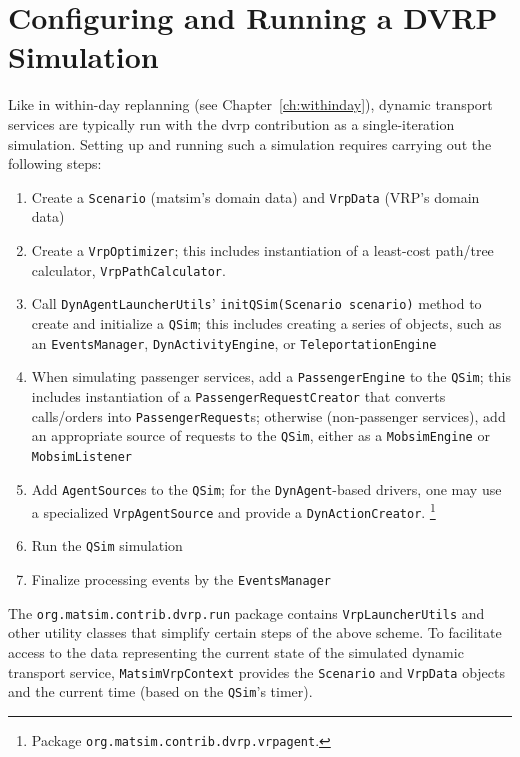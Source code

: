 \section{Configuring and Running a DVRP Simulation}
\label{sec:dvrp_config}
Like in within-day replanning (see Chapter~\ref{ch:withinday}), dynamic transport services are typically run with the \gls{dvrp} contribution as a single-iteration simulation. Setting up and running such a simulation requires carrying out the following steps:
%
\begin{enumerate}\styleEnumerate
	\item Create a \lstinline$Scenario$ (\gls{matsim}'s domain data) and \lstinline$VrpData$ (VRP's domain data)	
	\item Create a \lstinline$VrpOptimizer$; this includes instantiation of a least-cost path/tree calculator, \eg \lstinline$VrpPathCalculator$.
	\item Call \lstinline$DynAgentLauncherUtils$' \lstinline$initQSim(Scenario scenario)$ method to create and initialize a \lstinline$QSim$; this includes creating a series of objects, such as an \lstinline$EventsManager$, \lstinline$DynActivityEngine$, or \lstinline$TeleportationEngine$
	
	\item When simulating passenger services, add a \lstinline$PassengerEngine$ to the \lstinline$QSim$; this includes instantiation of a \lstinline$PassengerRequestCreator$ that converts calls/orders into \lstinline$PassengerRequest$s; otherwise (\ie non-passenger services), add an appropriate source of requests to the \lstinline$QSim$, either as a \lstinline$MobsimEngine$ or \lstinline$MobsimListener$
	
	\item Add \lstinline$AgentSource$s to the \lstinline$QSim$; for the \lstinline$DynAgent$-based drivers, one may use a specialized \lstinline$VrpAgentSource$ and provide a \lstinline$DynActionCreator$.%
	\footnote{
	Package \lstinline$org.matsim.contrib.dvrp.vrpagent$.
	}
	\item Run the \lstinline$QSim$ simulation
	\item Finalize processing events by the \lstinline$EventsManager$
\end{enumerate}

The \lstinline$org.matsim.contrib.dvrp.run$ package contains \lstinline$VrpLauncherUtils$ and other utility classes that simplify certain steps of the above scheme. To facilitate access to the data representing the current state of the simulated dynamic transport service, \lstinline$MatsimVrpContext$ provides the \lstinline$Scenario$ and \lstinline$VrpData$ objects and the current time (based on the \lstinline$QSim$'s timer).

